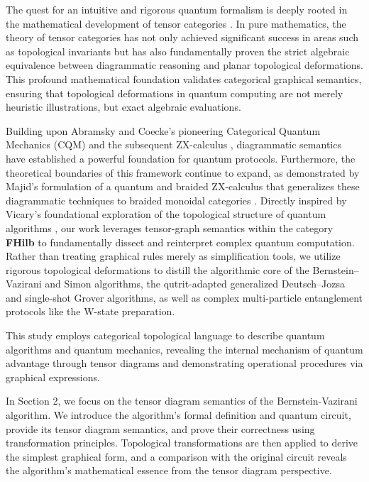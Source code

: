 \documentclass[a4paper,twocolumn,11pt,unpublished]{quantumarticle}
\numberwithin{equation}{section}
\begin{document}
The quest for an intuitive and rigorous quantum formalism is deeply rooted in the mathematical development of tensor categories \cite{Tur94, BK01, EGNO05}. In pure mathematics, the theory of tensor categories has not only achieved significant success in areas such as topological invariants but has also fundamentally proven the strict algebraic equivalence between diagrammatic reasoning and planar topological deformations. This profound mathematical foundation validates categorical graphical semantics, ensuring that topological deformations in quantum computing are not merely heuristic illustrations, but exact algebraic evaluations. 

Building upon Abramsky and Coecke's pioneering Categorical Quantum Mechanics (CQM) \cite{AC04} and the subsequent ZX-calculus \cite{CK17}, diagrammatic semantics have established a powerful foundation for quantum protocols. Furthermore, the theoretical boundaries of this framework continue to expand, as demonstrated by Majid's formulation of a quantum and braided ZX-calculus that generalizes these diagrammatic techniques to braided monoidal categories \cite{Maj23}. Directly inspired by Vicary's foundational exploration of the topological structure of quantum algorithms \cite{Vic13}, our work leverages tensor-graph semantics within the category \textbf{FHilb} to fundamentally dissect and reinterpret complex quantum computation. Rather than treating graphical rules merely as simplification tools, we utilize rigorous topological deformations to distill the algorithmic core of the Bernstein--Vazirani and Simon algorithms, the qutrit-adapted generalized Deutsch--Jozsa and single-shot Grover algorithms, as well as complex multi-particle entanglement protocols like the W-state preparation.

This study employs categorical topological language to describe quantum algorithms and quantum mechanics, revealing the internal mechanism of quantum advantage through tensor diagrams and demonstrating operational procedures via graphical expressions.

In Section 2, we focus on the tensor diagram semantics of the Bernstein-Vazirani algorithm. We introduce the algorithm's formal definition and quantum circuit, provide its tensor diagram semantics, and prove their correctness using transformation principles. Topological transformations are then applied to derive the simplest graphical form, and a comparison with the original circuit reveals the algorithm's mathematical essence from the tensor diagram perspective.
\end{document}
